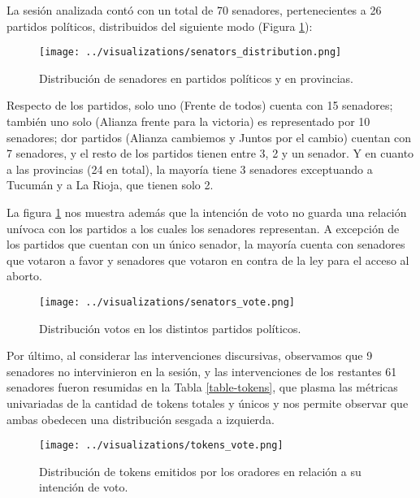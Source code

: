 La sesión analizada contó con un total de 70 senadores,
pertenecientes a 26 partidos políticos, distribuidos del
siguiente modo (Figura \ref{fig-distrib-senators}):

\begin{figure}[h!]
\centering
\texttt{[image: ../visualizations/senators\_distribution.png]}
\caption{Distribución de senadores en partidos políticos y en provincias.}
\label{fig-distrib-senators}
\end{figure}

Respecto de los partidos, solo uno (Frente de todos) cuenta con 15
senadores; también uno solo (Alianza frente para la victoria) es
representado por 10 senadores; dor partidos (Alianza cambiemos y
Juntos por el cambio) cuentan con 7 senadores, y el resto de los
partidos tienen entre 3, 2 y un senador. Y en cuanto a las provincias
(24 en total), la mayoría tiene 3 senadores exceptuando a Tucumán y
a La Rioja, que tienen solo 2.

La figura \ref{fig-distrib-senators} nos muestra además que la intención
de voto no guarda una relación unívoca con los partidos a los cuales los
senadores representan. A excepción de los partidos que cuentan con un único
senador, la mayoría cuenta con senadores que votaron a favor y senadores
que votaron en contra de la ley para el acceso al aborto.

\begin{figure}[h!]
\centering
\texttt{[image: ../visualizations/senators\_vote.png]}
\caption{Distribución votos en los distintos partidos políticos.}
\label{fig-distrib-vote}
\end{figure}

Por último, al considerar las intervenciones discursivas, observamos que
9 senadores no intervinieron en la sesión, y las intervenciones de los
restantes 61 senadores fueron resumidas en la Tabla \ref{table-tokens}, que plasma
las métricas univariadas de la cantidad de tokens totales y únicos y nos
permite observar que ambas obedecen una distribución sesgada a izquierda.

\begin{figure}[h!]
\centering
\texttt{[image: ../visualizations/tokens\_vote.png]}
\caption{Distribución de tokens emitidos por los oradores en relación a
su intención de voto.}
\label{fig-distrib-tokens-vote}
\end{figure}

